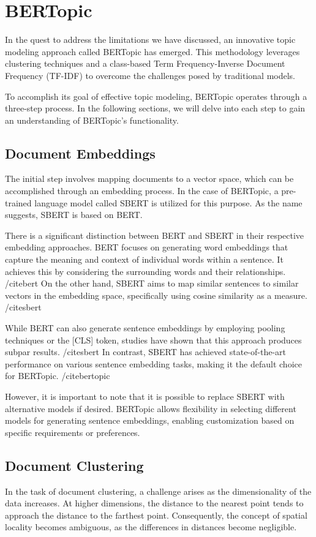 \documentclass[a4paper,12pt]{report} %
\begin{document}
\section{BERTopic}
In the quest to address the limitations we have discussed, an innovative topic modeling approach called BERTopic has emerged. This methodology leverages clustering techniques and a class-based Term Frequency-Inverse Document Frequency (TF-IDF) to overcome the challenges posed by traditional models.

To accomplish its goal of effective topic modeling, BERTopic operates through a three-step process. In the following sections, we will delve into each step to gain an understanding of BERTopic's functionality.

\subsection{Document Embeddings}
The initial step involves mapping documents to a vector space, which can be accomplished through an embedding process. In the case of BERTopic, a pre-trained language model called SBERT is utilized for this purpose. As the name suggests, SBERT is based on BERT.

There is a significant distinction between BERT and SBERT in their respective embedding approaches. BERT focuses on generating word embeddings that capture the meaning and context of individual words within a sentence. It achieves this by considering the surrounding words and their relationships. /cite{bert} On the other hand, SBERT aims to map similar sentences to similar vectors in the embedding space, specifically using cosine similarity as a measure. /cite{sbert}

While BERT can also generate sentence embeddings by employing pooling techniques or the [CLS] token, studies have shown that this approach produces subpar results. /cite{sbert} In contrast, SBERT has achieved state-of-the-art performance on various sentence embedding tasks, making it the default choice for BERTopic. /cite{bertopic}

However, it is important to note that it is possible to replace SBERT with alternative models if desired. BERTopic allows flexibility in selecting different models for generating sentence embeddings, enabling customization based on specific requirements or preferences.

\subsection{Document Clustering}
In the task of document clustering, a challenge arises as the dimensionality of the data increases. At higher dimensions, the distance to the nearest point tends to approach the distance to the farthest point. Consequently, the concept of spatial locality becomes ambiguous, as the differences in distances become negligible.
\end{document}
